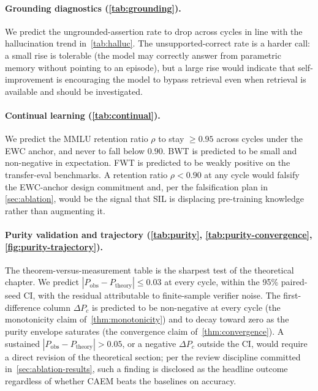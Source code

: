 \paragraph{Grounding diagnostics (\cref{tab:grounding}).}
We predict the ungrounded-assertion rate to drop across cycles in
line with the hallucination trend in~\cref{tab:halluc}. The
unsupported-correct rate is a harder call: a small rise is tolerable
(the model may correctly answer from parametric memory without
pointing to an episode), but a large rise would indicate that
self-improvement is encouraging the model to bypass retrieval even
when retrieval is available and should be investigated.

\paragraph{Continual learning (\cref{tab:continual}).}
We predict the MMLU retention ratio $\rho$ to stay $\ge 0.95$ across
cycles under the EWC anchor, and never to fall below $0.90$. BWT is
predicted to be small and non-negative in expectation. FWT is
predicted to be weakly positive on the transfer-eval benchmarks. A
retention ratio $\rho < 0.90$ at any cycle would falsify the
EWC-anchor design commitment and, per the falsification plan in
\cref{sec:ablation}, would be the signal that SIL is displacing
pre-training knowledge rather than augmenting it.

\paragraph{Purity validation and trajectory
(\cref{tab:purity}, \cref{tab:purity-convergence},
\cref{fig:purity-trajectory}).}
The theorem-versus-measurement table is the sharpest test of the
theoretical chapter. We predict $|P_{\text{obs}} -
P_{\text{theory}}| \le 0.03$ at every cycle, within the 95\%
paired-seed CI, with the residual attributable to finite-sample
verifier noise. The first-difference column $\Delta P_c$ is predicted
to be non-negative at every cycle (the monotonicity
claim of~\cref{thm:monotonicity}) and to decay toward zero as the
purity envelope saturates (the convergence claim
of~\cref{thm:convergence}). A sustained $|P_{\text{obs}} -
P_{\text{theory}}| > 0.05$, or a negative $\Delta P_c$ outside the CI,
would require a direct revision of the theoretical section; per the
review discipline committed in~\cref{sec:ablation-results}, such a
finding is disclosed as the headline outcome regardless of whether
CAEM beats the baselines on accuracy.

